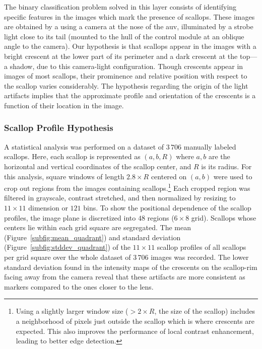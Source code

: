 \documentclass {udthesis}
\begin{document}
The binary classification problem solved in this layer consists of identifying specific features in the images which mark the presence of scallops.
These images are obtained by a using a 
camera at the nose of the \gls{auv}, illuminated by a strobe light close to its tail 
(mounted to the hull of the control module at an oblique angle to the camera).
Our hypothesis is that scallops appear in the images with 
a bright crescent at the lower part of its perimeter and a dark crescent at the top---a shadow, due to this camera-light configuration.
Though crescents appear in images of most scallops, their prominence and relative position with respect to the scallop varies considerably.
The hypothesis regarding the origin of the light artifacts implies that the approximate profile and orientation of the crescents is a function of their location in the image.



\subsubsection{Scallop Profile Hypothesis} \label{subsubsec:scallop_profile_hypothesis}

A statistical analysis was performed on  a dataset of $3\,706$ manually labeled scallops.
Here, each scallop is represented as $(a,b,R)$ 
where $a,b$ are the horizontal and vertical coordinates of the scallop center, 
and $R$ is its radius. 
For this analysis, square windows of length $2.8\times R$ 
centered on $(a,b)$ were used to crop out regions from the images containing scallops.\footnote{Using a slightly 
larger window size ($>2\times R$, the size of the scallop) includes
a neighborhood of pixels just outside the scallop which is where 
crescents are expected.
This also improves the performance of local contrast enhancement, leading to better edge detection.}
Each cropped region was filtered in grayscale, contrast stretched, and then normalized
by resizing to $11 \times 11$ dimension or $121$ bins.
To show the positional dependence of the scallop profiles,
the image plane is discretized into $48$ regions ($6\times8$ grid).
Scallops whose centers lie within each grid square are segregated.
The mean (Figure~\ref{subfig:mean_quadrant}) and standard deviation (Figure~\ref{subfig:stddev_quadrant}) 
of the $11 \times 11$ scallop profiles of all scallops per grid square 
over the whole dataset of $3\,706$ images was recorded.
The lower standard deviation found in the intensity maps of the crescents on the scallop-rim facing away from the camera reveal that these artifacts are more consistent as markers compared to the ones closer to the lens. 
\end{document}
